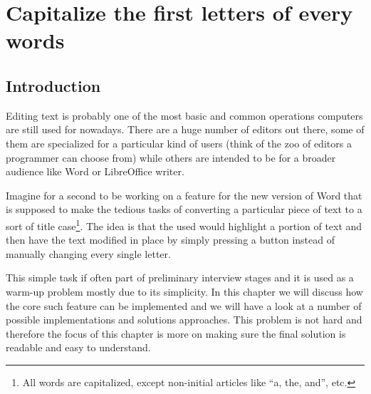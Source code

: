 %

\chapter{Capitalize the first letters of every words}
\label{ch:capitalize_words_first_letter}
\section*{Introduction}
Editing text is probably one of the most basic and common operations computers are still used for nowadays. There are a huge number of editors out there, some of them are specialized for a particular kind of users (think of the zoo of editors a programmer can choose from) while others are intended to be for a broader audience like Word or LibreOffice writer. 

Imagine for a second to be working on a feature for the new version of Word that is supposed to make the tedious tasks of converting a particular piece of text to a sort of title case\footnote{All words are capitalized, except non-initial articles like “a, the, and”, etc.}. The idea is that the used would highlight a portion of text and then have the text modified in place by simply pressing a button instead of manually changing every single letter. 

This simple task if often part of preliminary interview stages and it is used as a warm-up problem mostly due to its simplicity. 
In this chapter we will discuss how the core such feature can be implemented and we will have a look at a number of possible implementations and solutions approaches. This problem is not hard and therefore the focus of this chapter is more on making sure the final solution is readable and easy to understand.

